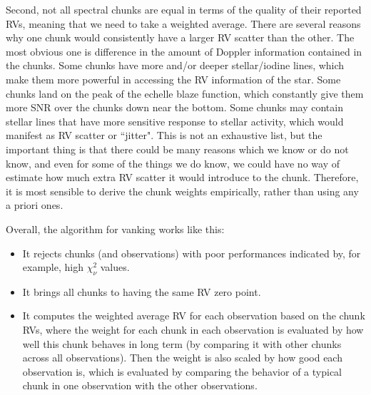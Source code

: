 Second, not all spectral chunks are equal in terms of the quality of
their reported RVs, meaning that we need to take a weighted
average. There are several reasons why one chunk would consistently
have a larger RV scatter than the other. The most obvious one is
difference in the amount of Doppler information contained in the
chunks. Some chunks have more and/or deeper stellar/iodine lines,
which make them more powerful in accessing the RV information of the
star. Some chunks land on the peak of the echelle blaze function,
which constantly give them more SNR over the chunks down near the
bottom. Some chunks may contain stellar lines that have more sensitive
response to stellar activity, which would manifest as RV scatter or
``jitter". This is not an exhaustive list, but the important thing is
that there could be many reasons which we know or do not know, and
even for some of the things we do know, we could have no way of
estimate how much extra RV scatter it would introduce to the
chunk. Therefore, it is most sensible to derive the chunk weights
empirically, rather than using any a priori ones.

Overall, the algorithm for vanking works like this:
\begin{itemize}
\item It rejects chunks (and observations) with poor performances
  indicated by, for example, high $\chi^2_\nu$ values.
\item It brings all chunks to having the same RV zero point.  
\item It computes the weighted average RV for each observation based
  on the chunk RVs, where the weight for each chunk in each
  observation is evaluated by how well this chunk behaves in long term
  (by comparing it with other chunks across all observations).
  Then the weight is also scaled by how good each observation is,
  which is evaluated by comparing the behavior of a typical chunk in
  one observation with the other observations.
\end{itemize} 

